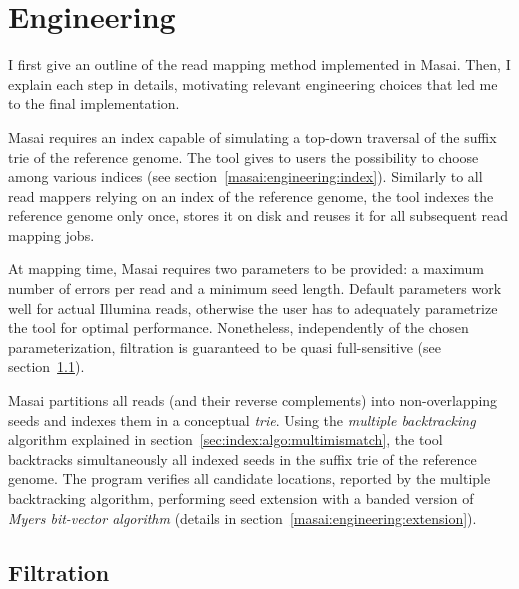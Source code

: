 
\vspace{-2mm}

\section{Engineering}

I first give an outline of the read mapping method implemented in Masai.
Then, I explain each step in details, motivating relevant engineering choices that led me to the final implementation.

Masai requires an index capable of simulating a top-down traversal of the suffix trie of the reference genome.
The tool gives to users the possibility to choose among various indices (see section~\ref{masai:engineering:index}).
Similarly to all read mappers relying on an index of the reference genome, the tool indexes the reference genome only once, stores it on disk and reuses it for all subsequent read mapping jobs.

At mapping time, Masai requires two parameters to be provided: a maximum number of errors per read and a minimum seed length.
Default parameters work well for actual Illumina reads, otherwise the user has to adequately parametrize the tool for optimal performance.
Nonetheless, independently of the chosen parameterization, filtration is guaranteed to be quasi full-sensitive (see section~\ref{masai:engineering:seeding}).

Masai partitions all reads (and their reverse complements) into non-overlapping seeds and indexes them in a conceptual \emph{trie}.
Using the \emph{multiple backtracking} algorithm explained in section~\ref{sec:index:algo:multimismatch}, the tool backtracks simultaneously all indexed seeds in the suffix trie of the reference genome.
The program verifies all candidate locations, reported by the multiple backtracking algorithm, performing seed extension with a banded version of \emph{Myers bit-vector algorithm} \citep{Myers1999} (details in section~\ref{masai:engineering:extension}).

\subsection{Filtration}
\label{masai:engineering:seeding}


